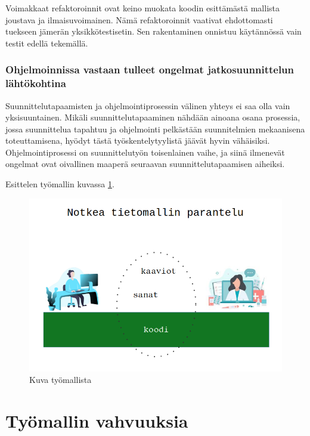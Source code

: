 Voimakkaat refaktoroinnit ovat keino muokata koodin esittämästä mallista
joustava ja ilmaisuvoimainen. Nämä refaktoroinnit vaativat ehdottomasti
tuekseen jämerän yksikkötestisetin. Sen rakentaminen onnistuu
käytännössä vain testit edellä tekemällä.

\hypertarget{ohjelmoinnissa-vastaan-tulleet-ongelmat-jatkosuunnittelun-luxe4htuxf6kohtina}{%
\subsubsection{Ohjelmoinnissa vastaan tulleet ongelmat jatkosuunnittelun
lähtökohtina}\label{ohjelmoinnissa-vastaan-tulleet-ongelmat-jatkosuunnittelun-luxe4htuxf6kohtina}}

Suunnittelutapaamisten ja ohjelmointiprosessin välinen yhteys ei saa
olla vain yksisuuntainen. Mikäli suunnittelutapaaminen nähdään ainoana
osana prosessia, jossa suunnittelua tapahtuu ja ohjelmointi pelkästään
suunnitelmien mekaanisena toteuttamisena, hyödyt tästä
työskentelytyylistä jäävät hyvin vähäisiksi. Ohjelmointiprosessi on
suunnittelutyön toisenlainen vaihe, ja siinä ilmenevät ongelmat ovat
oivallinen maaperä seuraavan suunnittelutapaamisen aiheiksi.

Esittelen työmallin kuvassa \ref{tyomalli}.

\begin{figure}
\centering
\includegraphics{illustration/malli/notkea_tietomallin_parantelu2-1.png}
\caption{\label{tyomalli} Kuva työmallista}
\end{figure}

\hypertarget{tyuxf6mallin-vahvuuksia}{%
\section{Työmallin vahvuuksia}\label{tyuxf6mallin-vahvuuksia}}


